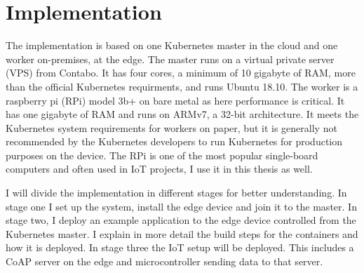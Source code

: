 \clearpage
\section{Implementation} \label{sec:implementation}
The implementation is based on one Kubernetes master in the cloud and one worker on-premises, at the edge. The master runs on a virtual private server (VPS) from Contabo\cite{online:ContaboWebsite}. 
It has four cores, a minimum of 10 gigabyte of RAM, more than the official Kubernetes requirments\cite{kubernetesRequirementsInstall:online}, and runs Ubuntu 18.10. The worker is a raspberry pi (RPi) model 3b+ on bare metal as here performance is critical. It has one gigabyte of RAM and runs on ARMv7, a 32-bit architecture. It meets the Kubernetes system requirements for workers on paper, but it is generally not recommended by the Kubernetes developers to run Kubernetes for production purposes on the device. The RPi is one of the most popular single-board computers and often used in IoT projects, I use it in this thesis as well.

I will divide the implementation in different stages for better understanding. In stage one I set up the system, install the edge device and join it to the master. In stage two, I deploy an example application to the edge device controlled from the Kubernetes master. I explain in more detail the build steps for the containers and how it is deployed. In stage three the IoT setup will be deployed. This includes a CoAP server on the edge and microcontroller sending data to that server. 











